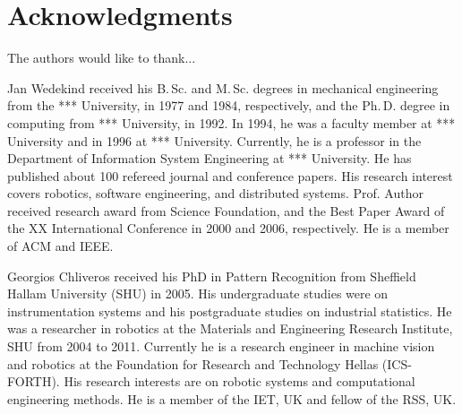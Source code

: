 \documentclass[10pt,journal,compsoc]{joser13}
\begin{document}
%
%
%
%
\section*{Acknowledgments}
The authors would like to thank...





\begin{IEEEbiography}[{wedekind}]{Jan Wedekind}
received his B.\,Sc. and
M.\,Sc. degrees in mechanical engineering from the *** University,
in 1977 and 1984, respectively, and the Ph.\,D. degree in
computing from *** University, in 1992. In 1994, he was a
faculty member at *** University and in 1996 at ***
University. Currently, he is a professor in the Department of
Information System Engineering at *** University.
He has published about 100 refereed journal and conference papers.
His research interest covers robotics, software engineering, and distributed
systems.
Prof. Author received research award from Science Foundation, and
the Best Paper Award of the XX International Conference in 2000 and
2006, respectively. He is a member of ACM and IEEE.
\end{IEEEbiography}

\begin{IEEEbiography}[{chliveros}]{Georgios Chliveros}
received his PhD in Pattern Recognition from Sheffield Hallam University (SHU)
in 2005. His undergraduate studies were on instrumentation systems and
his postgraduate studies on industrial statistics. 
He was a researcher in robotics at the Materials and Engineering Research Institute, SHU
from 2004 to 2011. Currently he is a research engineer in machine vision and robotics at
the Foundation for Research and Technology Hellas (ICS-FORTH).
His research interests are on robotic systems and
computational engineering methods.
He is a member of the IET, UK and fellow of the RSS, UK.
\end{IEEEbiography}
\end{document}
